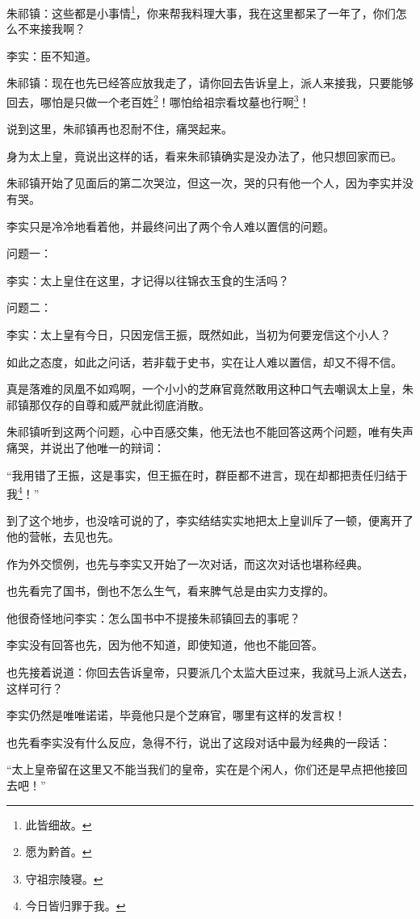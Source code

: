 \begin{multicols}{\theparacolNo}
朱祁镇：这些都是小事情\footnote{此皆细故。}，你来帮我料理大事，我在这里都呆了一年了，你们怎么不来接我啊？

李实：臣不知道。

朱祁镇：现在也先已经答应放我走了，请你回去告诉皇上，派人来接我，只要能够回去，哪怕是只做一个老百姓\footnote{愿为黔首。}！哪怕给祖宗看坟墓也行啊\footnote{守祖宗陵寝。}！

说到这里，朱祁镇再也忍耐不住，痛哭起来。

身为太上皇，竟说出这样的话，看来朱祁镇确实是没办法了，他只想回家而已。

朱祁镇开始了见面后的第二次哭泣，但这一次，哭的只有他一个人，因为李实并没有哭。

李实只是冷冷地看着他，并最终问出了两个令人难以置信的问题。

问题一：

李实：太上皇住在这里，才记得以往锦衣玉食的生活吗？

问题二：

李实：太上皇有今日，只因宠信王振，既然如此，当初为何要宠信这个小人？

如此之态度，如此之问话，若非载于史书，实在让人难以置信，却又不得不信。

真是落难的凤凰不如鸡啊，一个小小的芝麻官竟然敢用这种口气去嘲讽太上皇，朱祁镇那仅存的自尊和威严就此彻底消散。

朱祁镇听到这两个问题，心中百感交集，他无法也不能回答这两个问题，唯有失声痛哭，并说出了他唯一的辩词：

“我用错了王振，这是事实，但王振在时，群臣都不进言，现在却都把责任归结于我\footnote{今日皆归罪于我。}！”

到了这个地步，也没啥可说的了，李实结结实实地把太上皇训斥了一顿，便离开了他的营帐，去见也先。

作为外交惯例，也先与李实又开始了一次对话，而这次对话也堪称经典。

也先看完了国书，倒也不怎么生气，看来脾气总是由实力支撑的。

他很奇怪地问李实：怎么国书中不提接朱祁镇回去的事呢？

李实没有回答也先，因为他不知道，即使知道，他也不能回答。

也先接着说道：你回去告诉皇帝，只要派几个太监大臣过来，我就马上派人送去，这样可行？

李实仍然是唯唯诺诺，毕竟他只是个芝麻官，哪里有这样的发言权！

也先看李实没有什么反应，急得不行，说出了这段对话中最为经典的一段话：

“太上皇帝留在这里又不能当我们的皇帝，实在是个闲人，你们还是早点把他接回去吧！”


\end{multicols}
